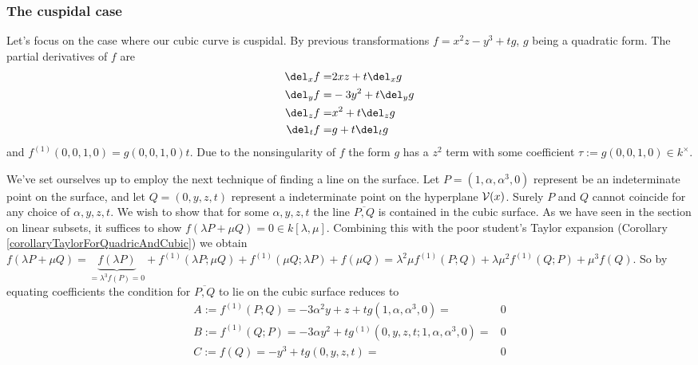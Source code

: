 \subsubsection{The cuspidal case}
Let's focus on the case where our cubic curve is cuspidal. By previous transformations $f = x^2z - y^3 + tg$, $g$ being a quadratic form.
The partial derivatives of $f$ are
\begin{align}
   \del_x f =& 2xz + t\del_x g
\\ \del_y f =& -3y^2 + t\del_y g
\\ \del_z f =& x^2 + t\del_z g
\\ \del_t f =& g + t\del_t g
\end{align}
and $f^{(1)}(0,0,1,0) = g(0,0,1,0)t$.
Due to the nonsingularity of $f$ the form $g$ has a $z^2$ term with some coefficient $\tau := g(0,0,1,0) \in k^\times$.

We've set ourselves up to employ the next technique of finding a line on the surface.
Let $P= (1,\alpha,\alpha^3,0)$ represent be an indeterminate point on the surface,
and let $Q = (0,y,z,t)$ represent a indeterminate point on the hyperplane $\operatorname{\mathcal V}(x)$.
Surely $P$ and $Q$ cannot coincide for any choice of $\alpha,y,z,t$.
We wish to show that for some $\alpha,y,z,t$ the line $\overline{P,Q}$ is contained in the cubic surface.
As we have seen in the section on linear subsets, it suffices to show $f(\lambda P + \mu Q) = 0 \in k[\lambda,\mu]$.
Combining this with the poor student's Taylor expansion (Corollary \ref{corollaryTaylorForQuadricAndCubic}) we obtain
$f(\lambda P + \mu Q)
= \underset{=\lambda^3 f(P) = 0}{\underbrace{f(\lambda P)}}
+ f^{(1)}(\lambda P;\mu Q)
+ f^{(1)}(\mu Q;\lambda P)
+ f(\mu Q)
= \lambda^2\mu f^{(1)}(P;Q)
+ \lambda\mu^2 f^{(1)}(Q;P)
+ \mu^3 f(Q)$.
So by equating coefficients the condition for $\overline{P,Q}$ to lie on the cubic surface reduces to
\begin{align}
A :=  f^{(1)}(P;Q) = -3\alpha^2 y + z + tg(1,\alpha,\alpha^3,0) =& 0 \\
B :=  f^{(1)}(Q;P) = -3\alpha y^2 + tg^{(1)}(0,y,z,t;1,\alpha,\alpha^3,0) =& 0 \\
C :=  f(Q)         = -y^3 + tg(0,y,z,t) =& 0
\end{align}

